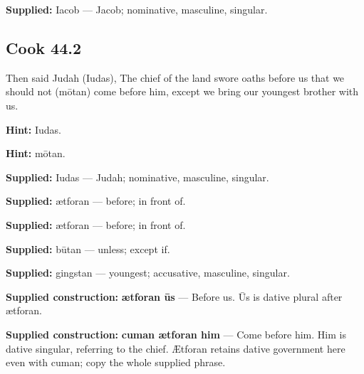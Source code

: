 \textbf{Supplied:} Iacob — Jacob; nominative, masculine, singular.

\par\begin{minipage}{\linewidth}\raggedright
\subsection*{Cook 44.2}

Then said Judah (Iudas), The chief of the land swore oaths before us that we should not (mōtan) come before him, except we bring our youngest brother with us.

\textbf{Hint:} Iudas.

\textbf{Hint:} mōtan.

\end{minipage}\par\addvspace{4pt}

\textbf{Supplied:} Iudas — Judah; nominative, masculine, singular.

\textbf{Supplied:} ætforan — before; in front of.

\textbf{Supplied:} ætforan — before; in front of.

\textbf{Supplied:} būtan — unless; except if.

\textbf{Supplied:} gingstan — youngest; accusative, masculine, singular.

\textbf{Supplied construction:} \textbf{ætforan ūs} — Before us. Ūs is dative plural after ætforan.

\textbf{Supplied construction:} \textbf{cuman ætforan him} — Come before him. Him is dative singular, referring to the chief. Ætforan retains dative government here even with cuman; copy the whole supplied phrase.

